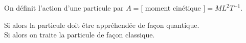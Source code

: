 ﻿\documentclass[a4paper]{article}
\begin{document}
\pagestyle{fancy}
\fancyhf{}
\setlength{\headheight}{15pt}

\begin{center}
	\large{}
\end{center}


On définit l'action d'une particule par \( A = [\) moment cinétique \(] = ML^2T^{ - 1} \).\par
Si  alors la particule doit être appréhendée de façon quantique.\\[2pt]
Si  alors on traite la particule de façon classique.
\end{document}
